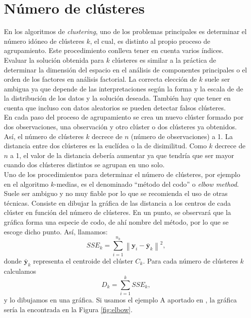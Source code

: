 \documentclass[a4paper, 20pt]{article}
\newcommand{\norm}[1]{\left\lVert#1\right\rVert}
\newcommand{\yy}{\textbf{y}}
\begin{document}
\section{Número de clústeres}\label{sec:num}
En los algoritmos de \textit{clustering}, uno de los problemas principales es determinar el número idóneo de clústeres $ k $, el cual, es distinto al propio proceso de agrupamiento. Este procedimiento conlleva tener en cuenta varios índices. Evaluar la solución obtenida para $ k $ clústeres es similar a la práctica de determinar la dimensión del espacio en el análisis de componentes principales o el orden de los factores en análisis factorial.
La correcta elección de $ k $ suele ser ambigua ya que depende de las interpretaciones según la forma y la escala de de la distribución de los datos y la solución deseada. También hay que tener en cuenta que incluso con datos aleatorios se pueden detectar falsos clústeres. \\

En cada paso del proceso de agrupamiento se crea un nuevo clúster formado por dos observaciones, una observación y otro clúster o dos clústeres ya obtenidos. Así, el número de clústeres $ k $ decrece de $ n $ (número de observaciones) a 1. La distancia entre dos clústeres es la euclídea o la de disimilitud. %
Como $ k $ decrece de $ n $ a 1, el valor de la distancia debería aumentar ya que tendría que ser mayor cuando dos clústeres distintos se agrupan en uno solo. \\

Uno de los procedimientos para determinar el número de clústeres, por ejemplo en el algoritmo $ k$-medias, es el denominado ``método del codo'' o \textit{elbow method}. Suele ser ambiguo y no muy fiable por lo que se recomienda el uso de otras técnicas. Consiste en dibujar la gráfica de las distancia a los centros de cada clúster en función del número de clústeres. En un punto, se observará que la gráfica forma una especie de codo, de ahí nombre del método, por lo que se escoge dicho punto. Así, llamamos:\\
\[
SSE_k = \sum_{i = 1}^{n_k} \norm{\yy_i - \bar{\yy}_k}^2,
\]
donde $ \bar{\yy}_k $ representa el centroide del clúster $ C_k $. Para cada número de clústeres $ k $ calculamos 
\[
D_k = \sum_{i = 1} ^ {k} SSE_k,
\]
y lo dibujamos en una gráfica. Si usamos el ejemplo A aportado en \cite{elbowGraph}, la gráfica sería la encontrada en la Figura \ref{fig:elbow}.
\end{document}
